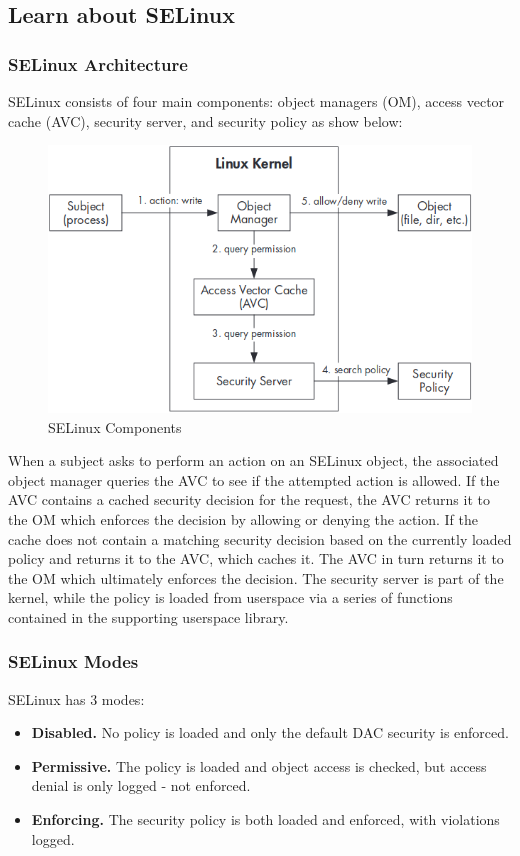 \subsection{Learn about SELinux}
\label{task:20231210_selinux}

\subsubsection{SELinux Architecture}

SELinux consists of four main components: object managers (OM), access vector cache (AVC), security server, and security policy as show below:
\begin{figure}[H]
    \centering
    \includegraphics[width=.85\linewidth]{entries/2023/12/10/selinux.png}
    \caption{SELinux Components}
    \label{fig:selinux}
\end{figure}
When a subject asks to perform an action on an SELinux object, the associated object manager queries the AVC to see if the attempted action is allowed. If the AVC contains a cached security decision for the request, the AVC returns it to the OM which enforces the decision by allowing or denying the action. If the cache does not contain a matching security decision based on the currently loaded policy and returns it to the AVC, which caches it. The AVC in turn returns it to the OM which ultimately enforces the decision. The security server is part of the kernel, while the policy is loaded from userspace via a series of functions contained in the supporting userspace library.

\subsubsection{SELinux Modes}

SELinux has 3 modes:
\begin{itemize}
\item \textbf{Disabled.} No policy is loaded and only the default DAC security is enforced.
\item \textbf{Permissive.} The policy is loaded and object access is checked, but access denial is only logged - not enforced.
\item \textbf{Enforcing.} The security policy is both loaded and enforced, with violations logged.
\end{itemize}


